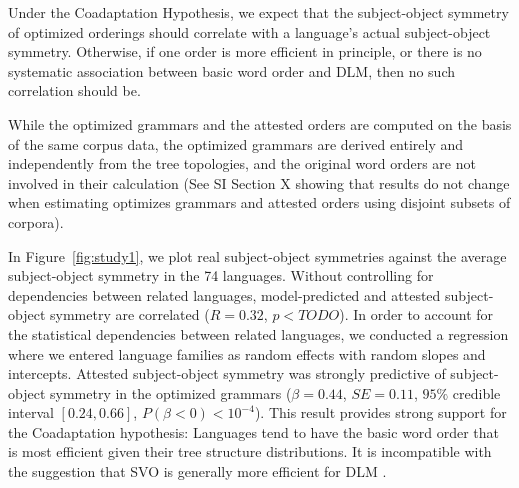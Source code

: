 \documentclass[11pt,a4paper]{article}
\newcommand\comment[1]{{\color{red}#1}}
\begin{document}

Under the Coadaptation Hypothesis, we expect that the subject-object symmetry of optimized orderings should correlate with a language's actual subject-object symmetry.
Otherwise, if one order is more efficient in principle, or there is no systematic association between basic word order and DLM, then no such correlation should be.


While the optimized grammars and the attested orders are computed on the basis of the same corpus data, the optimized grammars are derived entirely and independently from the tree topologies, and the original word orders are not involved in their calculation (See SI Section X showing that results do not change when estimating optimizes grammars and attested orders using disjoint subsets of corpora).



In Figure~\ref{fig:study1}, we plot real subject-object symmetries against the average subject-object symmetry in the 74 languages.
Without controlling for dependencies between related languages, model-predicted and attested subject-object symmetry are correlated ($R=0.32$, $p<TODO$).
In order to account for the statistical dependencies between related languages, we conducted a regression where we entered language families as random effects with random slopes and intercepts.
Attested subject-object symmetry was strongly predictive of subject-object symmetry in the optimized grammars ($\beta = 0.44$, $SE=0.11$, $95\%$ credible interval $[0.24, 0.66]$, $P(\beta<0) < 10^{-4}$).
This result provides strong support for the Coadaptation hypothesis: Languages tend to have the basic word order that is most efficient given their tree structure distributions.
It is incompatible with the suggestion that SVO is generally more efficient for DLM \citep{ferrer-i-cancho-placement-2017}.


\end{document}
